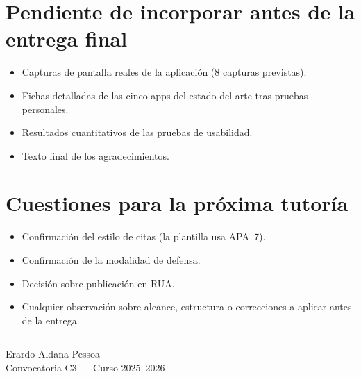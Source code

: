 \section*{Pendiente de incorporar antes de la entrega final}

\begin{itemize}
  \item Capturas de pantalla reales de la aplicación (8 capturas previstas).
  \item Fichas detalladas de las cinco apps del estado del arte tras pruebas personales.
  \item Resultados cuantitativos de las pruebas de usabilidad.
  \item Texto final de los agradecimientos.
\end{itemize}

\section*{Cuestiones para la próxima tutoría}

\begin{itemize}
  \item Confirmación del estilo de citas (la plantilla usa APA~7).
  \item Confirmación de la modalidad de defensa.
  \item Decisión sobre publicación en RUA.
  \item Cualquier observación sobre alcance, estructura o correcciones a aplicar antes de la entrega.
\end{itemize}

\noindent\rule{\textwidth}{0.4pt}
\begin{flushright}
\small Erardo Aldana Pessoa\\
Convocatoria C3 — Curso 2025--2026
\end{flushright}

\clearpage
